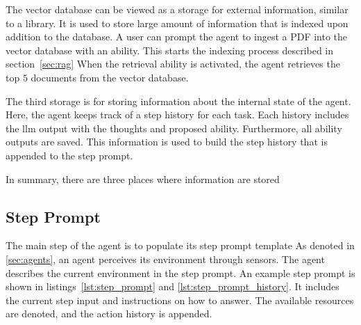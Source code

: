 \documentclass[../main.tex]{subfiles}
\begin{document}
The vector database can be viewed as a storage for external information,
similar to a library.
It is used to store large amount of information that is indexed upon addition
to the database.
A user can prompt the agent to ingest a PDF into the vector database with an ability.
This starts the indexing process described in section~\ref{sec:rag}
When the retrieval ability is activated, the agent retrieves the top $5$ documents
from the vector database.

The third storage is for storing information about the internal state of the agent.
Here, the agent keeps track of a step history for each task.
Each history includes the \gls{llm} output with the thoughts and proposed ability.
Furthermore, all ability outputs are saved.
This information is used to build the step history that is appended to the step prompt.

In summary, there are three places where information are stored

\subsection{Step Prompt}





The main step of the agent is to populate its step prompt template
As denoted in \autoref{sec:agents}, an agent perceives its environment through sensors.
The agent describes the current environment in the step prompt.
An example step prompt is shown in listings~\ref{lst:step_prompt} and \ref{lst:step_prompt_history}.
It includes the current step input and instructions on how to answer.
The available resources are denoted, and the action history is appended.
\end{document}
